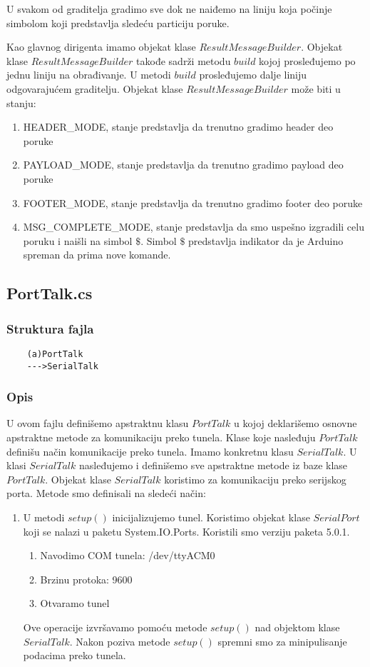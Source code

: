 \documentclass[a4paper]{extarticle}
\begin{document}
	U svakom od graditelja gradimo sve dok ne naiđemo na liniju koja počinje simbolom koji predstavlja sledeću particiju poruke.
	
	Kao glavnog dirigenta imamo objekat klase $ResultMessageBuilder$. Objekat klase $ResultMessageBuilder$ takođe sadrži  metodu $build$ kojoj prosleđujemo po jednu liniju na obrađivanje. U metodi $build$ prosleđujemo dalje liniju odgovarajućem graditelju. Objekat klase $ResultMessageBuilder$ može biti u stanju:
	\begin{enumerate}
		\item HEADER\_MODE, stanje predstavlja da trenutno gradimo header deo poruke
		\item PAYLOAD\_MODE, stanje predstavlja da trenutno gradimo payload deo poruke
		\item FOOTER\_MODE, stanje predstavlja da trenutno gradimo footer deo poruke
		\item MSG\_COMPLETE\_MODE, stanje predstavlja da smo uspešno izgradili celu poruku i naišli na simbol $\$$. Simbol $\$$ predstavlja indikator da je Arduino spreman da prima nove komande.
	\end{enumerate}

	\subsection{PortTalk.cs}
	\label{a7}
		\subsubsection*{Struktura fajla}
	\begin{verbatim}
	(a)PortTalk
	--->SerialTalk
	\end{verbatim}
	
	\subsubsection*{Opis}
	U ovom fajlu definišemo apstraktnu klasu $PortTalk$ u kojoj deklarišemo osnovne apstraktne metode za komunikaciju preko tunela. Klase koje nasleđuju $PortTalk$ definišu način komunikacije preko tunela. Imamo konkretnu klasu $SerialTalk$. U klasi $SerialTalk$ nasleđujemo i definišemo sve apstraktne metode iz baze klase $PortTalk$. Objekat klase $SerialTalk$ koristimo za komunikaciju preko serijskog porta. Metode smo definisali na sledeći način: 
	\begin{enumerate}
		\item U metodi $setup()$ inicijalizujemo tunel. Koristimo objekat klase $SerialPort$ koji se nalazi u paketu System.IO.Ports. Koristili smo verziju paketa 5.0.1.
		\begin{enumerate}
			\item Navodimo COM tunela: /dev/ttyACM0
			\item Brzinu protoka: 9600
			\item Otvaramo tunel
		\end{enumerate}
	Ove operacije izvršavamo pomoću metode $setup()$ nad objektom klase $SerialTalk$. Nakon poziva metode $setup()$ spremni smo za minipulisanje podacima preko tunela.
		 
	\end{enumerate}
\end{document}
